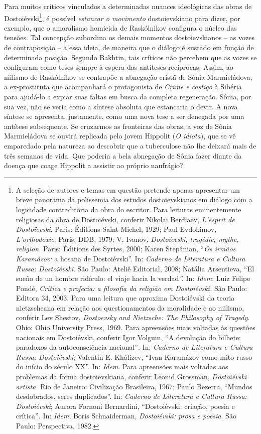 Para muitos críticos vinculados a determinadas nuances ideológicas das
obras de Dostoiévski\footnote{A seleção de autores e temas em questão
  pretende apenas apresentar um breve panorama da polissemia dos estudos
  dostoievskianos em diálogo com a logicidade contraditória da obra do
  escritor. Para leituras eminentemente religiosas da obra de
  Dostoiévski, conferir Nikolai Berdiaev, \emph{L'esprit de
  Dostoïevski}. Paris: Éditions Saint-Michel, 1929; Paul Evdokimov,
  \emph{L'orthodoxie}. Paris: DDB, 1979; V. Ivanov, \emph{Dostoïevski,
  tragédie, mythe, religion.} Paris: Éditions des Syrtes, 2000; Karen
  Stepânian, ``\emph{Os irmãos Karamázov:} a hosana de Dostoiévski''.
  In: \emph{Caderno de Literatura e Cultura Russa: Dostoiévski}. São
  Paulo: Ateliê Editorial, 2008; Natália Arsentieva, ``El sueño de un
  hombre ridículo: el viaje hacia la verdad\emph{''.} In: \emph{Idem};
  Luiz Felipe Pondé, \emph{Crítica e profecia: a filosofia da religião
  em Dostoiévski.} São Paulo: Editora 34, 2003. Para uma leitura que
  aproxima Dostoiévski da teoria nietzscheana em relação aos
  questionamentos da moralidade e ao niilismo, conferir Lev Shestov,
  \emph{Dostoevsky and Nietzsche: The Philosophy of Tragedy}. Ohio: Ohio
  University Press, 1969. Para apreensões mais voltadas às questões
  nacionais em Dostoiévski, conferir Igor Volguin, ``A devolução do
  bilhete: paradoxos da autoconsciência nacional''\emph{.} In:
  \emph{Caderno de Literatura e Cultura Russa: Dostoiévski}; Valentin E.
  Khálizev, ``Ivan Karamázov como mito russo do início do século XX''.
  In: \emph{Idem}. Para apreensões mais voltadas aos problemas da forma
  dostoievskiana, conferir Leonid Grossman, \emph{Dostoiévski artista.}
  Rio de Janeiro: Civilização Brasileira, 1967; Paulo Bezerra, ``Mundos
  desdobrados, seres duplicados''. In: \emph{Caderno de Literatura e
  Cultura Russa: Dostoiévski}; Aurora Fornoni Bernardini, ``Dostoiévski:
  criação, poesia e crítica''\emph{.} In: \emph{Idem}; Boris
  Schnaiderman, \emph{Dostoiévski: prosa e poesia}. São Paulo:
  Perspectiva, 1982.}, é possível \emph{estancar o movimento}
dostoievskiano para dizer, por exemplo, que o amoralismo homicida de
Raskólnikov configura o núcleo das tensões. Tal concepção subordina os
demais momentos dostoievskianos -- as vozes de contraposição -- a essa
ideia, de maneira que o diálogo é sustado em função de determinada
posição. Segundo Bakhtin, tais críticos não percebem que as vozes se
configuram como teses sempre à espera das antíteses recíprocas. Assim,
ao niilismo de Raskólnikov se contrapõe a abnegação cristã de Sônia
Marmieládova, a ex-prostituta que acompanhará o protagonista de
\emph{Crime e castigo} à Sibéria para ajudá-lo a expiar suas faltas em
busca da completa regeneração. Sônia, por sua vez, não se veria como a
síntese absoluta que estancaria o devir. A nova síntese se apresenta,
justamente, como uma nova tese a ser denegada por uma antítese
subsequente. Se cruzarmos as fronteiras das obras, a voz de Sônia
Marmieládova se ouvirá replicada pelo jovem Hippolit (\emph{O idiota}),
que se vê emparedado pela natureza ao descobrir que a tuberculose não
lhe deixará mais de três semanas de vida. Que poderia a bela abnegação
de Sônia fazer diante da doença que coage Hippolit a assistir ao próprio
naufrágio?


